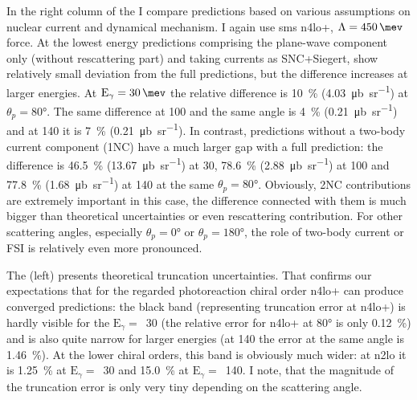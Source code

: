     
    In the right column of the  I compare predictions
    based on various assumptions on nuclear current and dynamical mechanism.
    I again use \gls{sms} \gls{n4lo+}, $\Lambda=\SI{450}{\mev}$ force.
    At the lowest energy predictions comprising the plane-wave component only (without rescattering part)
    and taking currents as SNC+Siegert, show relatively small deviation from the full predictions, but the difference increases at larger energies.
    At $\text{E}_\gamma=\SI{30}{\mev}$ the relative difference is \SI{10}{\percent} (\SI{4.03}{\micro \barn \per \steradian})
    at $\theta_p = \ang{80}$. The same difference at \SI{100}{\mev} and the same angle is \SI{4}{\percent} (\SI{0.21}{\micro \barn \per \steradian})
    and at \SI{140}{\mev} it is \SI{7}{\percent} (\SI{0.21}{\micro \barn \per \steradian}).
    In contrast, predictions without a two-body current component (1NC) have a much larger gap with a full prediction:
    the difference is \SI{46.5}{\percent} (\SI{13.67}{\micro \barn \per \steradian}) at \SI{30}{\mev},
    \SI{78.6}{\percent} (\SI{2.88}{\micro \barn \per \steradian}) at \SI{100}{\mev} and
    \SI{77.8}{\percent} (\SI{1.68}{\micro \barn \per \steradian}) at \SI{140}{\mev}
    at the same $\theta_p=\ang{80}$.
    Obviously, 2NC contributions are extremely important in this case, the difference connected with them
    is much bigger than theoretical uncertainties or even rescattering contribution.
    For other scattering angles, especially $\theta_p=\ang{0}$ or $\theta_p=\ang{180}$,
    the role of two-body current or FSI is relatively even more pronounced.


    The  (left)
    presents theoretical truncation uncertainties.
    That confirms our expectations
    that for the regarded photoreaction chiral order
    \gls{n4lo+} can produce converged predictions: 
    the black band (representing truncation error at \gls{n4lo+}) is hardly visible
    for the $\text{E}_\gamma=$~\SI{30}{\mev}
    (the relative error for \gls{n4lo+} at \ang{80} is only \SI{0.12}{\percent})
    and is also quite narrow for larger energies (at \SI{140}{\mev} 
    the error at the same angle is \SI{1.46}{\percent}).
    At the lower chiral orders, this band is obviously much wider:
    at \gls{n2lo} it is \SI{1.25}{\percent} at $\text{E}_\gamma=$~\SI{30}{\mev}
    and \SI{15.0}{\percent} at $\text{E}_\gamma=$~\SI{140}{\mev}.
    I note, that the magnitude of the truncation error is only very tiny depending on the scattering angle.
    
